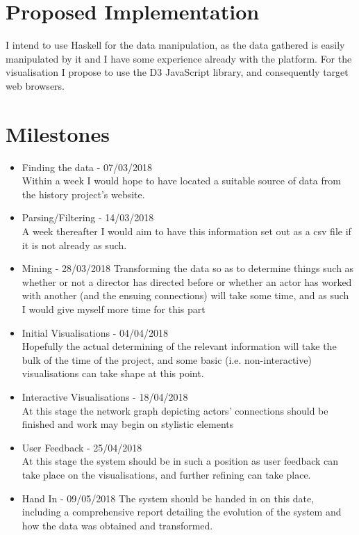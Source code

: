 \documentclass[12pt]{article}
\begin{document}
\section{Proposed Implementation}
I intend to use Haskell for the data manipulation, as the data gathered is easily manipulated by it and I have some experience already with the platform. 
For the visualisation I propose to use the D3 JavaScript library, and consequently target web browsers.

\section{Milestones}
\begin{itemize}
\item Finding the data - 07/03/2018\\
      Within a week I would hope to have located a suitable source of data from the history project's website.
\item Parsing/Filtering - 14/03/2018\\
      A week thereafter I would aim to have this information set out as a csv file if it is not already as such.
\item Mining - 28/03/2018
      Transforming the data so as to determine things such as whether or not a director has directed before or whether an actor has worked with another (and the ensuing connections) will take some time, and as such I would give myself more time for this part
\item Initial Visualisations - 04/04/2018\\
      Hopefully the actual determining of the relevant information will take the bulk of the time of the project, and some basic (i.e. non-interactive) visualisations can take shape at this point.
\item Interactive Visualisations - 18/04/2018\\
      At this stage the network graph depicting actors' connections should be finished and work may begin on stylistic elements
\item User Feedback - 25/04/2018\\
      At this stage the system should be in such a position as user feedback can take place on the visualisations, and further refining can take place.
\item Hand In - 09/05/2018
      The system should be handed in on this date, including a comprehensive report detailing the evolution of the system and how the data was obtained and transformed.
\end{itemize}
\end{document}
